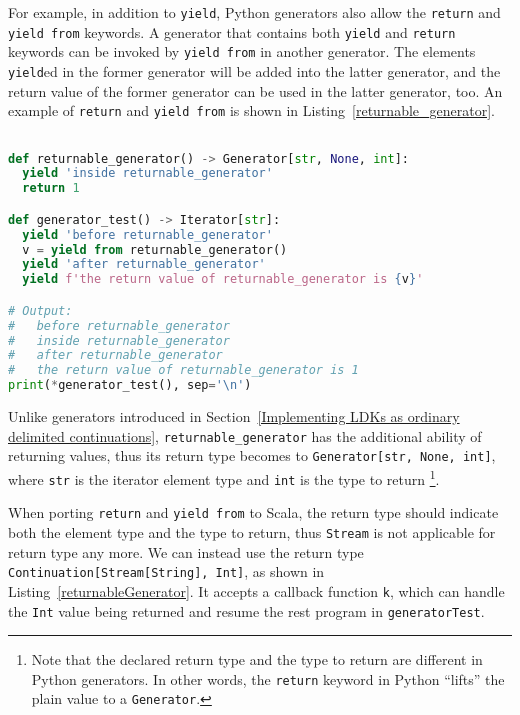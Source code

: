 For example, in addition to \lstinline{yield}, Python generators also allow the \lstinline{return} and \lstinline{yield from} keywords. A generator that contains both \lstinline{yield} and \lstinline{return} keywords can be invoked by \lstinline{yield from} in another generator. The elements \lstinline{yield}ed in the former generator will be added into the latter generator, and the return value of the former generator can be used in the latter generator, too. An example of \lstinline{return} and \lstinline{yield from} is shown in Listing~\ref{returnable_generator}.

\begin{lstlisting}[language=Python,style=Python3,caption={Use \lstinline{yield from} and \lstinline{return} in Python generators},label={returnable_generator}]

def returnable_generator() -> Generator[str, None, int]:
  yield 'inside returnable_generator'
  return 1

def generator_test() -> Iterator[str]:
  yield 'before returnable_generator'
  v = yield from returnable_generator()
  yield 'after returnable_generator'
  yield f'the return value of returnable_generator is {v}'

# Output:
#   before returnable_generator
#   inside returnable_generator
#   after returnable_generator
#   the return value of returnable_generator is 1
print(*generator_test(), sep='\n')
\end{lstlisting}

Unlike generators introduced in Section~\ref{Implementing LDKs as ordinary delimited continuations}, \lstinline{returnable_generator} has the additional ability of returning values, thus its return type becomes to \lstinline{Generator[str, None, int]}, where \lstinline{str} is the iterator element type and \lstinline{int} is the type to return \footnote{Note that the declared return type and the type to return are different in Python generators. In other words, the \lstinline{return} keyword in Python ``lifts'' the plain value to a \lstinline{Generator}.}.

When porting \lstinline{return} and \lstinline{yield from} to Scala, the return type should indicate both the element type and the type to return, thus \lstinline{Stream} is not applicable for return type any more. We can instead use the return type \lstinline{Continuation[Stream[String], Int]}, as shown in Listing~\ref{returnableGenerator}. It accepts a callback function \lstinline{k}, which can handle the \lstinline{Int} value being returned and resume the rest program in \lstinline{generatorTest}.

